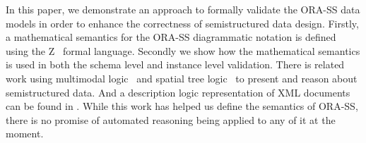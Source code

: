 \documentclass{entcs}
\begin{document}
In this paper, we demonstrate an approach to formally validate the
ORA-SS data models in order to enhance the correctness of
semistructured data design. Firstly, a mathematical semantics for
the ORA-SS diagrammatic notation is defined using the
Z~\cite{spi92a} formal language. Secondly we show how the
mathematical semantics is used in both the schema level and
instance level validation.
%
There is related work using multimodal logic~\cite{bidoit04} and
spatial tree logic~\cite{ConfortiG03} to present and reason about
semistructured data. And a description logic representation of XML
documents can be found in \cite{calvanese99representing}. While
this work has helped us define the semantics of ORA-SS, there is
no promise of automated reasoning being applied to any of it at
the moment.

\end{document}
